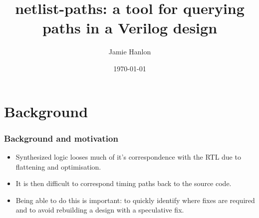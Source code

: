 \documentclass[professionalfonts]{beamer}
\begin{document}
\title{netlist-paths: a tool for querying paths in a Verilog design}
\author{Jamie Hanlon}
\date{\today}
\frame{\titlepage}

\section{Background}
\begin{frame}
\frametitle{Background and motivation}
  \begin{itemize}
  \item Synthesized logic looses much of it's correspondence with the
    RTL due to flattening and optimisation.
  \item It is then difficult to correspond timing paths back to the source code.
  \item Being able to do this is important: to quickly identify where fixes are
    required and to avoid rebuilding a design with a speculative fix.
  \end{itemize}
\end{frame}
\end{document}
